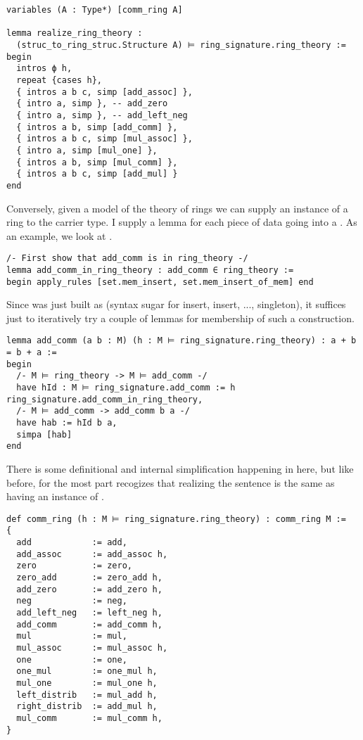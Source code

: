 \begin{lstlisting}
variables (A : Type*) [comm_ring A]

lemma realize_ring_theory :
  (struc_to_ring_struc.Structure A) ⊨ ring_signature.ring_theory :=
begin
  intros ϕ h,
  repeat {cases h},
  { intros a b c, simp [add_assoc] },
  { intro a, simp }, -- add_zero
  { intro a, simp }, -- add_left_neg
  { intros a b, simp [add_comm] },
  { intros a b c, simp [mul_assoc] },
  { intro a, simp [mul_one] },
  { intros a b, simp [mul_comm] },
  { intros a b c, simp [add_mul] }
end
\end{lstlisting}

Conversely, given a model of the theory of rings
we can supply an instance of a ring to the carrier type.
I supply a lemma for each piece of data going into a .
As an example, we look at .

\begin{lstlisting}
/- First show that add_comm is in ring_theory -/
lemma add_comm_in_ring_theory : add_comm ∈ ring_theory :=
begin apply_rules [set.mem_insert, set.mem_insert_of_mem] end\end{lstlisting}

Since  was just built as
 (syntax sugar for
insert, insert, ..., singleton), it suffices just to iteratively
try a couple of lemmas for membership of such a construction.

\begin{lstlisting}
lemma add_comm (a b : M) (h : M ⊨ ring_signature.ring_theory) : a + b = b + a :=
begin
  /- M ⊨ ring_theory -> M ⊨ add_comm -/
  have hId : M ⊨ ring_signature.add_comm := h ring_signature.add_comm_in_ring_theory,
  /- M ⊨ add_comm -> add_comm b a -/
  have hab := hId b a,
  simpa [hab]
end\end{lstlisting}

There is some definitional and internal simplification happening in here,
but like before, for the most part  recogizes that
realizing the sentence  is the same as having
an instance of .

\begin{lstlisting}
def comm_ring (h : M ⊨ ring_signature.ring_theory) : comm_ring M :=
{
  add            := add,
  add_assoc      := add_assoc h,
  zero           := zero,
  zero_add       := zero_add h,
  add_zero       := add_zero h,
  neg            := neg,
  add_left_neg   := left_neg h,
  add_comm       := add_comm h,
  mul            := mul,
  mul_assoc      := mul_assoc h,
  one            := one,
  one_mul        := one_mul h,
  mul_one        := mul_one h,
  left_distrib   := mul_add h,
  right_distrib  := add_mul h,
  mul_comm       := mul_comm h,
}\end{lstlisting}

